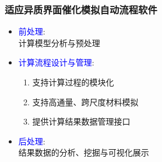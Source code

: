 
\begin{frame}
	\frametitle{适应异质界面催化模拟自动流程软件}
\begin{minipage}[c]{0.42\linewidth}
\begin{itemize}
\vspace*{-2.75in}
	\item \textcolor{blue}{前处理}:\\
		计算模型分析与预处理
	\item \textcolor{blue}{计算流程设计与管理}:\\
		\begin{enumerate}
			\item 支持计算过程的模块化
			\item 支持高通量、跨尺度材料模拟
			\item 提供计算结果数据管理接口
		\end{enumerate}
	\item \textcolor{blue}{后处理}:\\
		结果数据的分析、挖掘与可视化展示
\end{itemize}
\end{minipage}
\hskip 2pt
\begin{minipage}[b]{0.47\linewidth}
\begin{figure}[h!]
\centering

\end{figure}
\end{minipage}
\end{frame}
